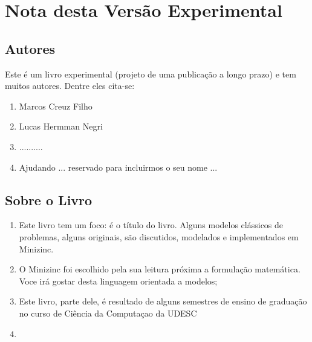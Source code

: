 
\chapter*{Nota desta Versão Experimental}


\section*{Autores}

Este é um livro experimental (projeto de uma publicação a longo prazo) e tem muitos autores. Dentre eles cita-se:

\begin{enumerate}
\item Marcos Creuz Filho
\item Lucas Hermman Negri
\item ..........
\item Ajudando ... reservado para incluirmos o seu nome  ...

\end{enumerate}


\section*{Sobre o Livro}

\begin{enumerate}
\item Este livro tem um foco: é o título do livro. Alguns modelos
clássicos de problemas, alguns originais, 
são discutidos, modelados e implementados em Minizinc.

\item O Minizinc foi escolhido pela sua leitura próxima a formulação
matemática. Voce irá gostar desta linguagem orientada a modelos;


\item Este livro, parte dele, é resultado de alguns semestres de ensino de graduação no curso de Ciência da Computaçao da UDESC

\item 

\end{enumerate}

